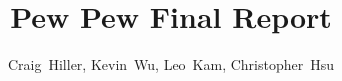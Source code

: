 \documentclass[journal]{IEEEtran}
\begin{document}

%
\title{Pew Pew Final Report}
%
%
%

\author{Craig~Hiller,
Kevin~Wu,
        Leo~Kam, Christopher~Hsu}%

% 
%



%
{}
% 

\maketitle
\end{document}

